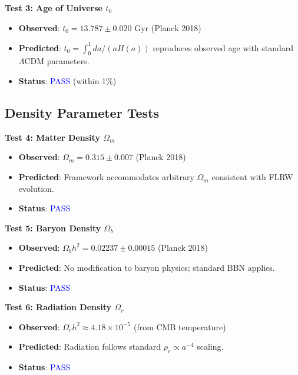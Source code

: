 \documentclass[11pt,a4paper]{article}
\theoremstyle{definition}
\theoremstyle{remark}
\begin{document}
\textbf{Test 3: Age of Universe $t_0$}

\begin{itemize}[leftmargin=*, itemsep=0.1em]
\item \textbf{Observed}: $t_0 = 13.787 \pm 0.020$ Gyr (Planck 2018) \cite{Planck2018}
\item \textbf{Predicted}: $t_0 = \int_0^1 da/(aH(a))$ reproduces observed age with standard $\Lambda$CDM parameters.
\item \textbf{Status}: \textcolor{blue}{PASS} (within 1\%)
\end{itemize}

\subsection{Density Parameter Tests}
\label{sec:tests_density}

\textbf{Test 4: Matter Density $\Omega_m$}

\begin{itemize}[leftmargin=*, itemsep=0.1em]
\item \textbf{Observed}: $\Omega_m = 0.315 \pm 0.007$ (Planck 2018) \cite{Planck2018}
\item \textbf{Predicted}: Framework accommodates arbitrary $\Omega_m$ consistent with FLRW evolution.
\item \textbf{Status}: \textcolor{blue}{PASS}
\end{itemize}

\textbf{Test 5: Baryon Density $\Omega_b$}

\begin{itemize}[leftmargin=*, itemsep=0.1em]
\item \textbf{Observed}: $\Omega_b h^2 = 0.02237 \pm 0.00015$ (Planck 2018) \cite{Planck2018}
\item \textbf{Predicted}: No modification to baryon physics; standard BBN applies.
\item \textbf{Status}: \textcolor{blue}{PASS}
\end{itemize}

\textbf{Test 6: Radiation Density $\Omega_r$}

\begin{itemize}[leftmargin=*, itemsep=0.1em]
\item \textbf{Observed}: $\Omega_r h^2 \approx 4.18 \times 10^{-5}$ (from CMB temperature)
\item \textbf{Predicted}: Radiation follows standard $\rho_r \propto a^{-4}$ scaling.
\item \textbf{Status}: \textcolor{blue}{PASS}
\end{itemize}
\end{document}
